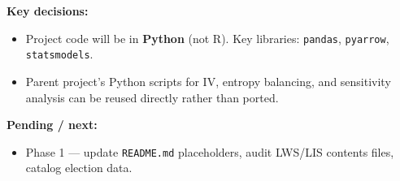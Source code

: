 \documentclass[11pt]{article}
\begin{document}
\textbf{Key decisions:}
\begin{itemize}
  \item Project code will be in \textbf{Python} (not R). Key libraries: \texttt{pandas}, \texttt{pyarrow}, \texttt{statsmodels}.
  \item Parent project's Python scripts for IV, entropy balancing, and sensitivity analysis can be reused directly rather than ported.
\end{itemize}

\textbf{Pending / next:}
\begin{itemize}
  \item Phase 1 --- update \texttt{README.md} placeholders, audit LWS/LIS contents files, catalog election data.
\end{itemize}

\end{document}
